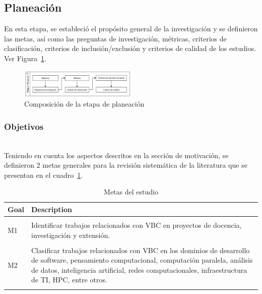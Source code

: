 \subsection{Planeación}\label{subsec:planeacion}
En esta etapa, se estableció el propósito general de la investigación y se definieron las metas, así como las preguntas de investigación, métricas, criterios de clasificación, criterios de inclusión/exclusión y criterios de calidad de los estudios. Ver Figura~\ref{fig:etapa1}.

\begin{figure}[htbp]
    \centering
    \includegraphics[width=0.5\textwidth]{resources/images/planeacion/etapa1.png}
    \caption{Composición de la etapa de planeación}\label{fig:etapa1}
\end{figure}

\subsubsection{Objetivos}
\mbox{}\\
Teniendo en cuenta los aspectos descritos en la sección de motivación, se definieron 2 metas generales para la revisión sistemática de la literatura que se presentan en el cuadro~\ref{tab:metas}.

\begin{table}[htbp]
    \centering
    \begin{tabular}{>{\centering\arraybackslash}m{1cm} >{\arraybackslash}m{7cm}}
        \hline
        \textbf{Goal} & \textbf{Description} \\
        \hline\\
        M1 & Identificar trabajos relacionados con VBC en proyectos de docencia, investigación y extensión. \\
        \\
        M2 & Clasificar trabajos relacionados con VBC en los dominios de desarrollo de software, pensamiento computacional, computación paralela, análisis de datos, inteligencia artificial, redes computacionales, infraestructura de TI, HPC, entre otros. \\\\
        
        \hline
    \end{tabular}
    \caption{Metas del estudio}\label{tab:metas}
\end{table}

